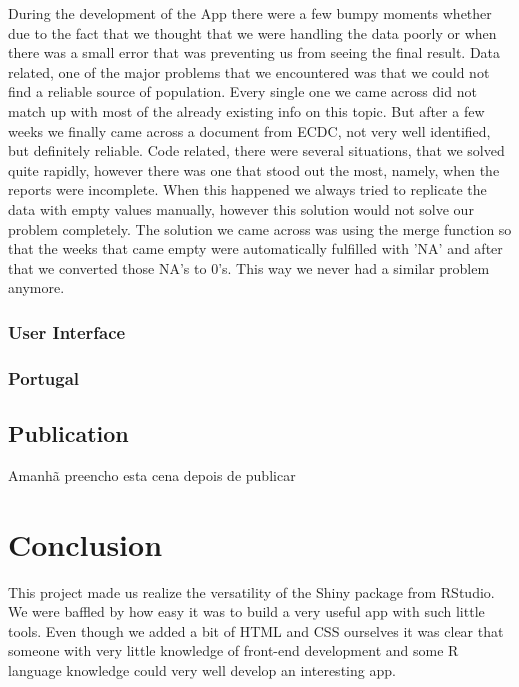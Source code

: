 \documentclass[11pt,a4paper]{report}
\begin{document}
During the development of the App there were a few bumpy moments whether due to the fact that we thought that we were handling the data poorly or when there was a small error that was preventing us from seeing the final result.
Data related, one of the major problems that we encountered was that we could not find a reliable source of population. Every single one we came across did not match up with most of the already existing info on this topic. But after a few weeks we finally came across a document from ECDC, not very well identified, but definitely reliable.
Code related, there were several situations, that we solved quite rapidly, however there was one that stood out the most, namely, when the reports were incomplete. When this happened we always tried to replicate the data with empty values manually, however this solution would not solve our problem completely. The solution we came across was using the merge function so that the weeks that came empty were automatically fulfilled with 'NA' and after that we converted those NA's to 0's. This way we never had a similar problem anymore.

\subsection{User Interface}


\subsection{Portugal}




\section{Publication}
Amanhã preencho esta cena depois de publicar

\chapter{Conclusion}

This project made us realize the versatility of the Shiny package from RStudio. We were baffled by how easy it was to build a very useful app with such little tools. Even though we added a bit of HTML and CSS ourselves it was clear that someone with very little knowledge of front-end development and some R language knowledge could very well develop an interesting app.
\end{document}
